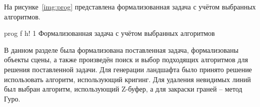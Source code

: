 На рисунке~\ref{img:prog} представлена формализованная задача с учётом выбранных алгоритмов.

\FloatBarrier
{}
{prog} %
{f} %
{h!} %
{1\textwidth} %
{Формализованная задача с учётом выбранных алгоритмов} %
\FloatBarrier


В данном разделе была формализована поставленная задача, формализованы объекты сцены, а также произведён поиск и выбор подходящих алгоритмов для решения поставленной задачи. Для генерации ландшафта было принято решение использовать алгоритм, использующий кригинг. Для удаления невидимых линий был выбран алгоритм, использующий Z-буфер, а для закраски граней -- метод Гуро.